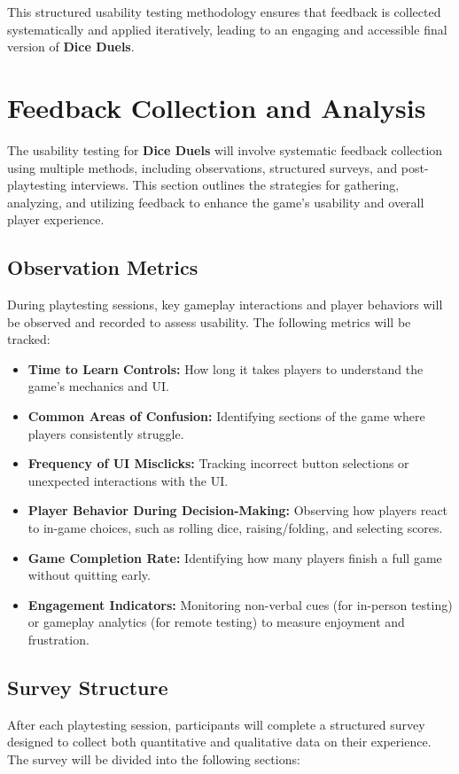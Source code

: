 \documentclass[12pt, titlepage]{article}
\begin{document}
This structured usability testing methodology ensures that feedback is collected systematically and applied iteratively, leading to an engaging and accessible final version of \textbf{Dice Duels}.

\newpage

\section{Feedback Collection and Analysis}

The usability testing for \textbf{Dice Duels} will involve systematic feedback collection using multiple methods, including observations, structured surveys, and post-playtesting interviews. This section outlines the strategies for gathering, analyzing, and utilizing feedback to enhance the game’s usability and overall player experience.

\subsection{Observation Metrics}
During playtesting sessions, key gameplay interactions and player behaviors will be observed and recorded to assess usability. The following metrics will be tracked:
\begin{itemize}
    \item \textbf{Time to Learn Controls:} How long it takes players to understand the game’s mechanics and UI.
    \item \textbf{Common Areas of Confusion:} Identifying sections of the game where players consistently struggle.
    \item \textbf{Frequency of UI Misclicks:} Tracking incorrect button selections or unexpected interactions with the UI.
    \item \textbf{Player Behavior During Decision-Making:} Observing how players react to in-game choices, such as rolling dice, raising/folding, and selecting scores.
    \item \textbf{Game Completion Rate:} Identifying how many players finish a full game without quitting early.
    \item \textbf{Engagement Indicators:} Monitoring non-verbal cues (for in-person testing) or gameplay analytics (for remote testing) to measure enjoyment and frustration.
\end{itemize}

\subsection{Survey Structure}
After each playtesting session, participants will complete a structured survey designed to collect both quantitative and qualitative data on their experience. The survey will be divided into the following sections:
\end{document}
